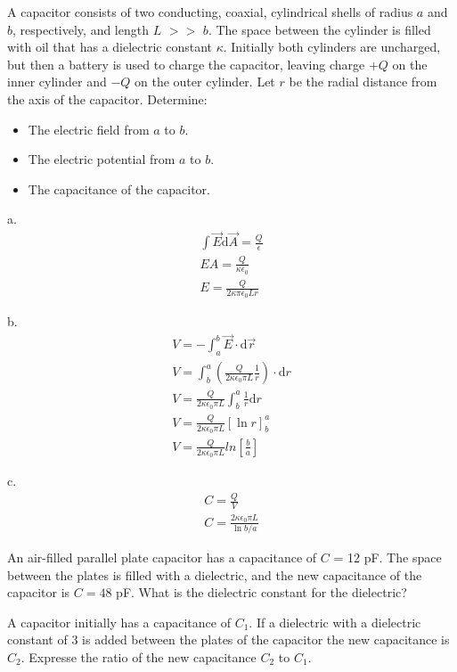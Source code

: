 \documentclass[../em.tex]{subfiles}
\begin{document}
\begin{example}
    A capacitor consists of two conducting, coaxial, cylindrical shells of radius $a$ and $b$, respectively,
    and length $L$ $>>$ $b$. The space between the cylinder is filled with oil that has a dielectric constant $\kappa$.
    Initially both cylinders are uncharged, but then a battery is used to charge the capacitor, leaving charge $+Q$ 
    on the inner cylinder and $-Q$ on the outer cylinder. Let $r$ be the radial distance from the axis of the capacitor.
    Determine:
    \begin{itemize}
        \item The electric field from $a$ to $b$.
        \item The electric potential from $a$ to $b$.
        \item The capacitance of the capacitor.
    \end{itemize}

    a.
    \begin{align*}
        \int \vec{E}\mathrm{d}\vec{A}=\frac{Q}{\epsilon}\\ 
        EA = \frac{Q}{\kappa\epsilon_0}\\
        E = \frac{Q}{2\kappa \pi\epsilon_0 L r}
    \end{align*} 

    b.
    \begin{align*}
        V = -\int_a^b \vec{E}\cdot\mathrm{d}\vec{r}\\
        V = \int^a_b \left(\frac{Q}{2\kappa\epsilon_0 \pi L}\frac{1}{r}\right)\cdot \mathrm{d}r\\
        V = \frac{Q}{2\kappa\epsilon_0\pi L}\int_b^a \frac{1}{r}\mathrm{d}r\\
        V = \frac{Q}{2\kappa\epsilon_0\pi L}[\ln r]^a_b \\
        V = \frac{Q}{2\kappa\epsilon_0\pi L}ln\left[\frac{b}{a}\right]
    \end{align*}

    c.
    \begin{align*}
        C = \frac{Q}{V}\\
        C = \frac{2\kappa \epsilon_0 \pi L}{\ln b/a}
    \end{align*}

\end{example}
\ex An air-filled parallel plate capacitor has a capacitance of $C$ = 12 pF. The space between the plates is filled with a dielectric, and the new capacitance of the capacitor is $C=48$ pF. What is the dielectric constant for the dielectric?

\ex A capacitor initially has a capacitance of $C_1$. If a dielectric with a dielectric constant of 3 is added between the plates of the capacitor the new 
capacitance is $C_2$. Expresse the ratio of the new capacitance $C_2$ to $C_1$.
\end{document}
